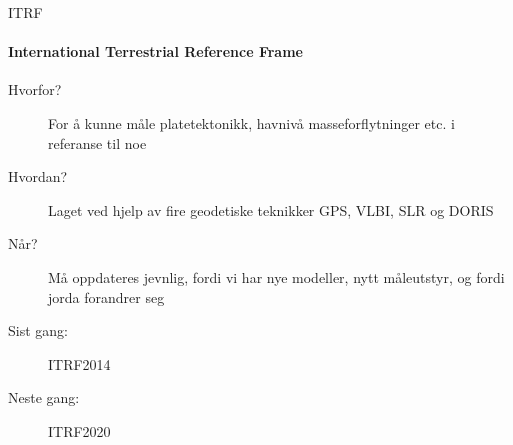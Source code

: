 \documentclass[12pt,table,t]{beamer}
\begin{document}
\begin{frame}{ITRF}
\framesubtitle{International Terrestrial Reference Frame}
  \begin{description}
    \item[Hvorfor?] For å kunne måle platetektonikk, havnivå masseforflytninger etc. i referanse til noe
    \item[Hvordan?] Laget ved hjelp av fire geodetiske teknikker GPS, VLBI, SLR og DORIS
    \item[Når?] Må oppdateres jevnlig, fordi vi har nye modeller, nytt måleutstyr, og fordi jorda forandrer seg
    \item[Sist gang:] ITRF2014
    \item[Neste gang:] ITRF2020
  \end{description}
\end{frame}
\end{document}
